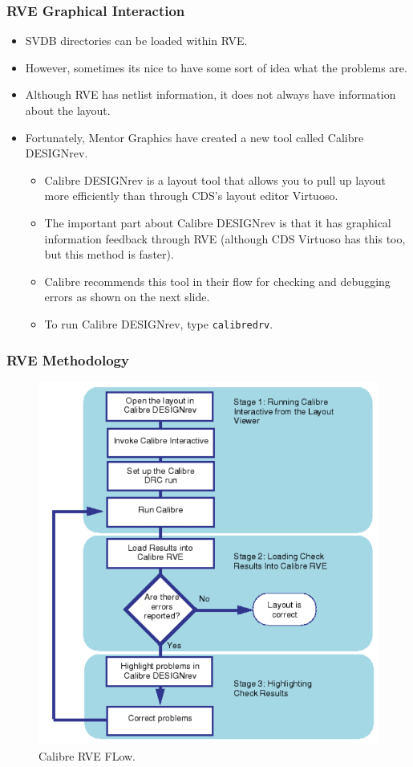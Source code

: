 \documentclass{beamer}
\begin{document}
\begin{frame}[fragile]
\frametitle{RVE Graphical Interaction}
\begin{itemize}
\item SVDB directories can be loaded within RVE.
\item However, sometimes its nice to have some sort of idea what the
  problems are. 
\item Although RVE has netlist information, it does not always have
  information about the layout.
\item Fortunately, Mentor Graphics have created a new tool called
  Calibre DESIGNrev.
\begin{itemize}
\item Calibre DESIGNrev is a layout tool that allows you to pull up
  layout more efficiently than through CDS's layout
  editor Virtuoso.
\item The important part about Calibre DESIGNrev is that it has
  graphical information feedback through RVE (although CDS Virtuoso has
  this too, but this method is faster).
\item Calibre recommends this tool in their flow for checking and
  debugging errors as shown on the next slide.
\item To run Calibre DESIGNrev, type \verb+calibredrv+.
\end{itemize}
\end{itemize}
\end{frame}
\begin{frame}
\frametitle{RVE Methodology}
\begin{center}
\begin{figure}
	\vspace{-0.1in}
\includegraphics[scale=0.23]{Fig/lvs2-1.png} 
\vspace{-0.1in}
\caption{Calibre RVE FLow.}
\end{figure}
\end{center}
\end{frame}
\end{document}
